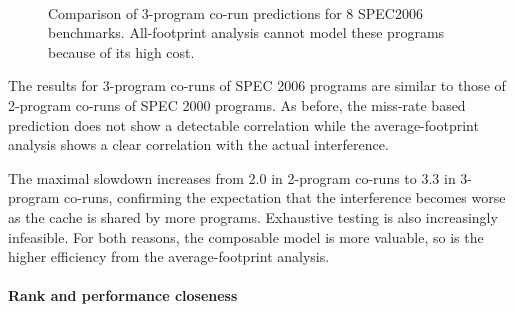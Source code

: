 \begin{figure}[h!]
\centering
{}\\
\caption{Comparison of 3-program co-run predictions for 8 SPEC2006
  benchmarks.  All-footprint analysis cannot model these programs
  because of its high cost.}
\label{fig:3corun}
\end{figure}

The results for 3-program co-runs of SPEC 2006 programs are similar to
those of 2-program co-runs of SPEC 2000 programs.  As before, the
miss-rate based prediction does not show a detectable correlation
while the average-footprint analysis shows a clear correlation with the
actual interference.

The maximal slowdown increases from 2.0 in 2-program co-runs to 3.3 in
3-program co-runs, confirming the expectation that the interference
becomes worse as the cache is shared by more programs.
Exhaustive testing is also increasingly infeasible.  For both reasons, the
composable model is more valuable, so is the higher efficiency from the
average-footprint analysis.  

\paragraph{Rank and performance closeness}

